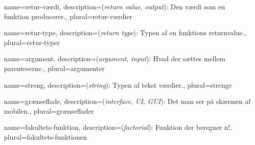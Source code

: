 \usepackage[toc]{glossaries}

\makeglossaries

{
	name={retur-værdi},
	description={(\textit{return value, output}): Den værdi som en funktion 
				 producerer.},
	plural={retur-værdier}
}

{
	name={retur-type},
	description={(\textit{return type}): Typen af en funktions 
				 \gls{returnvalue}.},
	plural={retur-typer}
}

{
	name={argument},
	description={(\textit{argument, input}): Hvad der sættes mellem 
				 parenteserne.},
	plural={argumenter}
}

{
	name={streng},
	description={(\textit{string}): Typen af tekst værdier.},
	plural={strenge}
}

{
	name={grænseflade},
	description={(\textit{interface, UI, GUI}): Det man ser på skærmen af
		 		 mobilen.},
	plural={grænseflader}
}

{
	name={fakultets-funktion},
	description={(\textit{factorial}): Funktion der beregner n!},
	plural={fakultets-funktionen}
}